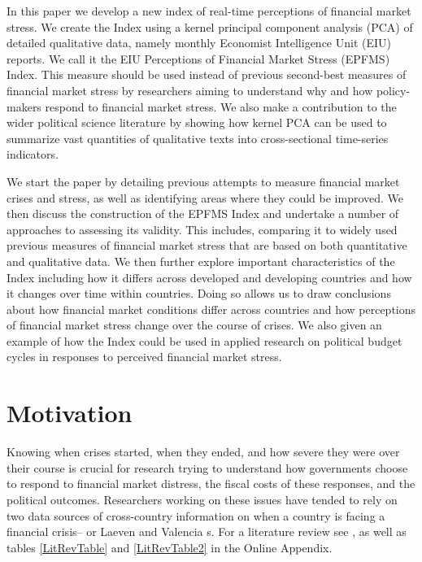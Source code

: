 \documentclass[]{article}
\begin{document}
In this paper we develop a new index of real-time perceptions of financial market stress. We create the Index using a kernel principal component analysis (PCA) of detailed qualitative data, namely monthly Economist Intelligence Unit (EIU) reports. We call it the EIU Perceptions of Financial Market Stress (EPFMS) Index. This measure should be used instead of previous second-best measures of financial market stress by researchers aiming to understand why and how policy-makers respond to financial market stress. We also make a contribution to the wider political science literature by showing how kernel PCA can be used to summarize vast quantities of qualitative texts into cross-sectional time-series indicators.

We start the paper by detailing previous attempts to measure financial market crises and stress, as well as identifying areas where they could be improved. We then discuss the construction of the EPFMS Index and undertake a number of approaches to assessing its validity. This includes, comparing it to widely used previous measures of financial market stress that are based on both quantitative and qualitative data. We then further explore important characteristics of the Index including how it differs across developed and developing countries and how it changes over time within countries. Doing so allows us to draw conclusions about how financial market conditions differ across countries and how perceptions of financial market stress change over the course of crises. We also given an example of how the Index could be used in applied research on political budget cycles in responses to perceived financial market stress.

\section{Motivation}\label{motivation}

Knowing when crises started, when they ended, and how severe they were over their course is crucial for research trying to understand how governments choose to respond to financial market distress, the fiscal costs of these responses, and the political outcomes. Researchers working on these issues have tended to rely on two data sources of cross-country information on when a country is facing a financial crisis--\cite{Reinhart2009,ReinhartRog2010} or Laeven and Valencia \citeyearpar[and their predecessors]{laeven2013}s. For a literature review see \cite{GandrudHallerberg2015}, as well as tables \ref{LitRevTable} and \ref{LitRevTable2} in the Online Appendix.
\end{document}
